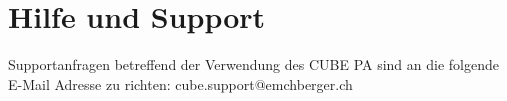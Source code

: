 
\clearpage
\section{Hilfe und Support}
\label{bkm:Ref443502661}

Supportanfragen betreffend der Verwendung des CUBE PA sind an die folgende E-Mail Adresse zu richten: {\color{red} cube.support@emchberger.ch}

